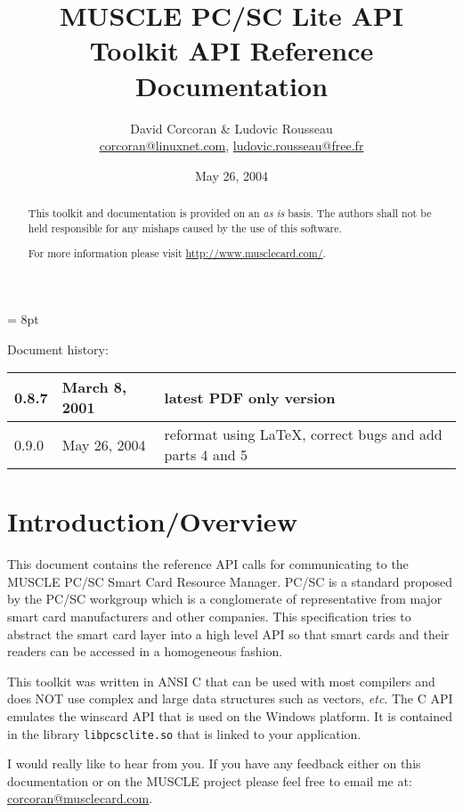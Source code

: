 \documentclass[a4paper,12pt]{article}
\title{MUSCLE PC/SC Lite API \\ Toolkit API Reference Documentation}
\author{David Corcoran \& Ludovic Rousseau\\
\url{corcoran@linuxnet.com}, \url{ludovic.rousseau@free.fr}}
\date{May 26, 2004}
\begin{document}
\maketitle

\begin{abstract}
This toolkit and documentation is provided on an \emph{as is} basis.
The authors shall not be held responsible for any mishaps caused by the
use of this software.

For more information please visit \url{http://www.musclecard.com/}.

\end{abstract}

\parskip = 8pt

\addtolength{\parindent}{-\parindent}

Document history: \\
\begin{tabular}{|l|l|l|}
\hline
0.8.7 & March 8, 2001 & latest PDF only version \\
\hline
0.9.0 & May 26, 2004 & reformat using \LaTeX{}, correct bugs and add
parts 4 and 5 \\
\hline
\end{tabular}

\newpage
\tableofcontents
\newpage

\section{Introduction/Overview}

This document contains the reference API calls for communicating to the
MUSCLE PC/SC Smart Card Resource Manager. PC/SC is a standard proposed by
the PC/SC workgroup \cite{pcsc_workgroup} which is a conglomerate of
representative from major smart card manufacturers and other companies.
This specification tries to abstract the smart card layer into a high
level API so that smart cards and their readers can be accessed in a
homogeneous fashion.

This toolkit was written in ANSI C that can be used with most compilers
and does NOT use complex and large data structures such as vectors,
\textit{etc}.  The C API emulates the winscard API that is used on the
Windows platform. It is contained in the library \texttt{libpcsclite.so}
that is linked to your application.

I would really like to hear from you. If you have any feedback either on
this documentation or on the MUSCLE project please feel free to email me
at: \url{corcoran@musclecard.com}.
\end{document}
